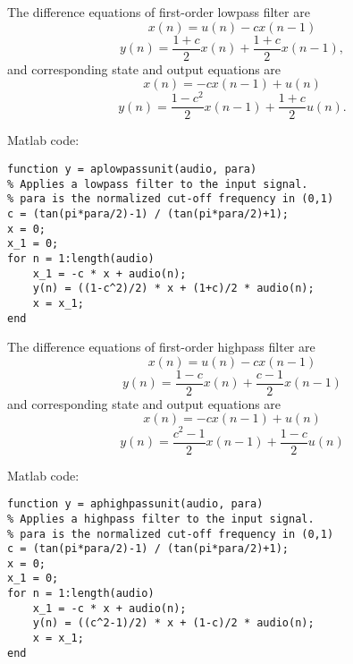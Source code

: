 \documentclass[10pt,a4paper,oneside]{beamer}
\begin{document}
\begin{frame}
The difference equations of first-order lowpass filter are
\[
x(n) = u(n) - cx(n-1)
\]
\[
y(n) = \frac{1+c}{2}x(n) + \frac{1+c}{2}x(n-1),
\]
and corresponding state and output equations are
\[
x(n) = -cx(n-1) +u(n)
\]
\[
y(n) = \frac{1-c^2}{2}x(n-1) + \frac{1+c}{2}u(n).
\]
\end{frame}
\begin{frame}[fragile]
Matlab code:
\begin{lstlisting}
function y = aplowpassunit(audio, para)
% Applies a lowpass filter to the input signal.
% para is the normalized cut-off frequency in (0,1)
c = (tan(pi*para/2)-1) / (tan(pi*para/2)+1);
x = 0;
x_1 = 0;
for n = 1:length(audio)
    x_1 = -c * x + audio(n);
    y(n) = ((1-c^2)/2) * x + (1+c)/2 * audio(n);
    x = x_1;   
end
\end{lstlisting}
\end{frame}
\begin{frame}
The difference equations of first-order highpass filter are
\[
x(n) = u(n) - cx(n-1)
\]
\[
y(n) = \frac{1-c}{2}x(n) + \frac{c-1}{2}x(n-1)
\]
and corresponding state and output equations are
\[
x(n) = -cx(n-1) +u(n)
\]
\[
y(n) = \frac{c^2-1}{2}x(n-1) + \frac{1-c}{2}u(n)
\]
\end{frame}
\begin{frame}[fragile]
Matlab code:
\begin{lstlisting}
function y = aphighpassunit(audio, para)
% Applies a highpass filter to the input signal.
% para is the normalized cut-off frequency in (0,1)
c = (tan(pi*para/2)-1) / (tan(pi*para/2)+1);
x = 0;
x_1 = 0;
for n = 1:length(audio)
    x_1 = -c * x + audio(n);
    y(n) = ((c^2-1)/2) * x + (1-c)/2 * audio(n);
    x = x_1;  
end
\end{lstlisting}
\end{frame}
\end{document}
